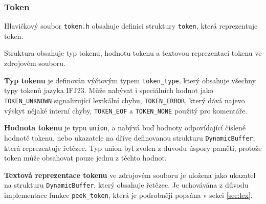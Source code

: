 \documentclass[a4paper, 11pt]{article}
\begin{document}
	\newpage
	\subsubsection{Token}
	Hlavičkový soubor \texttt{token.h} obsahuje definici struktury \texttt{token}, která reprezentuje token.
	\par\noindent Struktura obsahuje typ tokenu, hodnotu tokenu a textovou reprezentaci tokenu ve zdrojovém souboru. 
	\par\noindent \textbf{Typ tokenu} je definován výčtovým typem \texttt{token\_type}, který obsahuje všechny typy tokenů jazyka IFJ23. Může nabývat i speciálních hodnot jako \texttt{TOKEN\_UNKNOWN} signalizující lexikální chybu, \texttt{TOKEN\_ERROR}, který dává najevo výskyt nějaké interní chyby, \texttt{TOKEN\_EOF} a \texttt{TOKEN\_NONE} použitý pro komentáře.
	\par\noindent \textbf{Hodnota tokenu} je typu \texttt{union}, a nabývá buď hodnoty odpovídající číslené hodnotě tokenu, nebo ukazatele na dříve definovanou strukturu \texttt{DynamicBuffer}, která reprezentuje řetězec.
	Typ union byl zvolen z důvodu úspory paměti, protože token může obsahovat pouze jednu z těchto hodnot.
	\par\noindent \textbf{Textová reprezentace tokenu} ve zdrojovém souboru je uložena jako ukazatel na strukturu \texttt{DynamicBuffer}, který obsahuje řetězec.
	Je uchovávána z důvodu implementace funkce \texttt{peek\_token}, která je podrobněji popsána v sekci \ref{sec:lex}.
\end{document}
